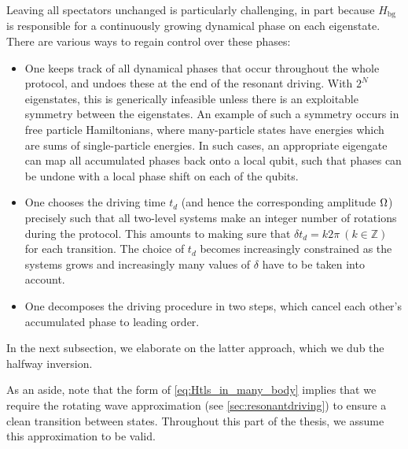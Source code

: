 Leaving all spectators unchanged is particularly challenging, in part because $H_\text{bg}$ is responsible for a continuously growing dynamical phase on each eigenstate. There are various ways to regain control over these phases:
\begin{itemize}
\item One keeps track of all dynamical phases that occur throughout the whole protocol, and undoes these at the end of the resonant driving. With $2^N$ eigenstates, this is generically infeasible unless there is an exploitable symmetry between the eigenstates. An example of such a symmetry occurs in free particle Hamiltonians, where many-particle states have energies which are sums of single-particle energies. In such cases, an appropriate eigengate can map all accumulated phases back onto a local qubit, such that phases can be undone with a local phase shift on each of the qubits. 
\item One chooses the driving time $t_d$ (and hence the corresponding amplitude $\Omega$) precisely such that all two-level systems make an integer number of rotations during the protocol. This amounts to making sure that $\delta t_d = k 2\pi \ (k \in \mathbb{Z})$ for each transition. The choice of $t_d$ becomes increasingly constrained as the systems grows and increasingly many values of $\delta$ have to be taken into account. 
\item One decomposes the driving procedure in two steps, which cancel each other's accumulated phase to leading order. 
\end{itemize}
In the next subsection, we elaborate on the latter approach, which we dub the halfway inversion. 

As an aside, note that the form of \cref{eq:Htls_in_many_body} implies that we require the rotating wave approximation (see \cref{sec:resonantdriving}) to ensure a clean transition between states. Throughout this part of the thesis, we assume this approximation to be valid. 


